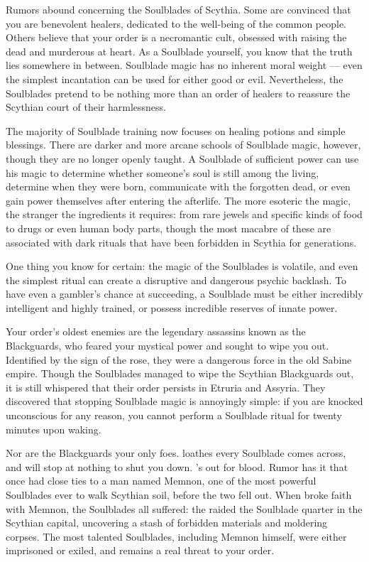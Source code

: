 \documentclass[blue]{Kos}
\begin{document}
\name{\bSoulblades{}}

	Rumors abound concerning the Soulblades of Scythia. Some are convinced that you are benevolent healers, dedicated to the well-being of the common people. Others believe that your order is a necromantic cult, obsessed with raising the dead and murderous at heart. As a Soulblade yourself, you know that the truth lies somewhere in between. Soulblade magic has no inherent moral weight --– even the simplest incantation can be used for either good or evil. Nevertheless, the Soulblades pretend to be nothing more than an order of healers to reassure the Scythian court of their harmlessness. 

The majority of Soulblade training now focuses on healing potions and simple blessings. There are darker and more arcane schools of Soulblade magic, however, though they are no longer openly taught. A Soulblade of sufficient power can use his magic to determine whether someone’s soul is still among the living, determine when they were born, communicate with the forgotten dead, or even gain power themselves after entering the afterlife. The more esoteric the magic, the stranger the ingredients it requires: from rare jewels and specific kinds of food to drugs or even human body parts, though the most macabre of these are associated with dark rituals that have been forbidden in Scythia for generations. 

One thing you know for certain: the magic of the Soulblades is volatile, and even the simplest ritual can create a disruptive and dangerous psychic backlash. To have even a gambler's chance at succeeding, a Soulblade must be either incredibly intelligent and highly trained, or possess incredible reserves of innate power. 

Your order's oldest enemies are the legendary assassins known as the Blackguards, who feared your mystical power and sought to wipe you out. Identified by the sign of the rose, they were a dangerous force in the old Sabine empire. Though the Soulblades managed to wipe the Scythian Blackguards out, it is still whispered that their order persists in Etruria and Assyria. They discovered that stopping Soulblade magic is annoyingly simple: if you are knocked unconscious for any reason, you cannot perform a Soulblade ritual for twenty minutes upon waking.

Nor are the Blackguards your only foes. \cScythiaQueen{\Monarch} \cScythiaQueen{} loathes every Soulblade \cScythiaQueen{\they} comes across, and will stop at nothing to shut you down. \cScythiaQueen{\They}’s out for blood. Rumor has it that \cScythiaQueen{\they} once had close ties to a man named Memnon, one of the most powerful Soulblades ever to walk Scythian soil, before the two fell out. When \cScythiaQueen{\they} broke faith with Memnon, the Soulblades all suffered: the \cScythiaQueen{\monarch} raided the Soulblade quarter in the Scythian capital, uncovering a stash of forbidden materials and moldering corpses. The most talented Soulblades, including Memnon himself, were either imprisoned or exiled, and \cScythiaQueen{} remains a real threat to your order.
\end{document}
